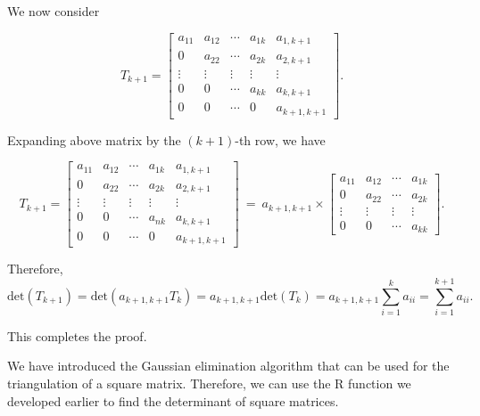 \documentclass[
]{book}
\begin{document}
We now consider

\[
T_{k+1} = \left[\begin{array}{ccccc} 
a_{11} & a_{12} & \cdots & a_{1k} & a_{1,k+1} \\ 
0 & a_{22} & \cdots & a_{2k}  & a_{2,k+1} \\ 
\vdots & \vdots & \vdots & \vdots & \vdots \\
0 & 0 & \cdots & a_{kk}  & a_{k,k+1} \\
0 & 0 & \cdots & 0  & a_{k+1,k+1}
\end{array}
\right].
\]

Expanding above matrix by the \((k+1)\)-th row, we have

\[
T_{k+1} = \left[\begin{array}{ccccc} 
a_{11} & a_{12} & \cdots & a_{1k} & a_{1,k+1} \\ 
0 & a_{22} & \cdots & a_{2k}  & a_{2,k+1} \\ 
\vdots & \vdots & \vdots & \vdots & \vdots \\
0 & 0 & \cdots & a_{nk}  & a_{k,k+1} \\
0 & 0 & \cdots & 0  & a_{k+1,k+1}
\end{array}
\right]
~
=
~
a_{k+1, k+1}\times \left[\begin{array}{ccccc} 
a_{11} & a_{12} & \cdots & a_{1k}  \\ 
0 & a_{22} & \cdots & a_{2k}  \\ 
\vdots & \vdots & \vdots & \vdots  \\
0 & 0 & \cdots & a_{kk}  
\end{array}
\right].
\]

Therefore,
\[
\text{det}(T_{k+1}) = \text{det}(a_{k+1,k+1}T_k) = a_{k+1, k+1} \text{det}(T_k) = a_{k+1, k+1}\sum_{i=1}^k a_{ii} = \sum_{i=1}^{k+1} a_{ii}.
\]

This completes the proof.

\hfill\break

We have introduced the Gaussian elimination algorithm that can be used for the triangulation of a square matrix. Therefore, we can use the R function we developed earlier to find the determinant of square matrices.
\end{document}
